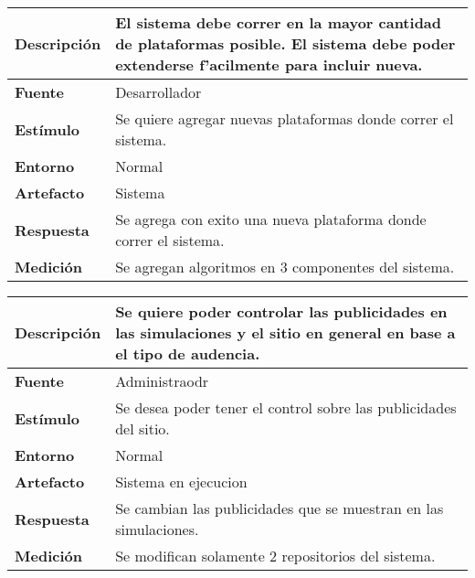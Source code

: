 \begin{center}
  \begin{tabular}{| l | p{10cm} | }
    \hline
  \textbf{Descripción} & El sistema debe correr en la mayor cantidad de plataformas posible. El sistema debe poder extenderse f'acilmente para incluir nueva.\\  \hline
  \textbf{Fuente} & Desarrollador\\  \hline
  \textbf{Estímulo} & Se quiere agregar nuevas plataformas donde correr el sistema.\\  \hline
  \textbf{Entorno} & Normal\\  \hline
  \textbf{Artefacto} & Sistema\\  \hline
  \textbf{Respuesta} & Se agrega con exito una nueva plataforma donde correr el sistema.\\  \hline
  \textbf{Medición} & Se agregan algoritmos en 3 componentes del sistema.\\  \hline
  \end{tabular}
\end{center} 

\begin{center}
  \begin{tabular}{| l | p{10cm} | }
    \hline
  \textbf{Descripción} & Se quiere poder controlar las publicidades en las simulaciones y el sitio en general en base a el tipo de audencia.\\  \hline
  \textbf{Fuente} & Administraodr\\  \hline
  \textbf{Estímulo} & Se desea poder tener el control sobre las publicidades del sitio.\\  \hline
  \textbf{Entorno} & Normal\\  \hline
  \textbf{Artefacto} & Sistema en ejecucion\\  \hline
  \textbf{Respuesta} & Se cambian las publicidades que se muestran en las simulaciones.\\  \hline
  \textbf{Medición} & Se modifican solamente 2 repositorios del sistema.\\  \hline
  \end{tabular}
\end{center} 

